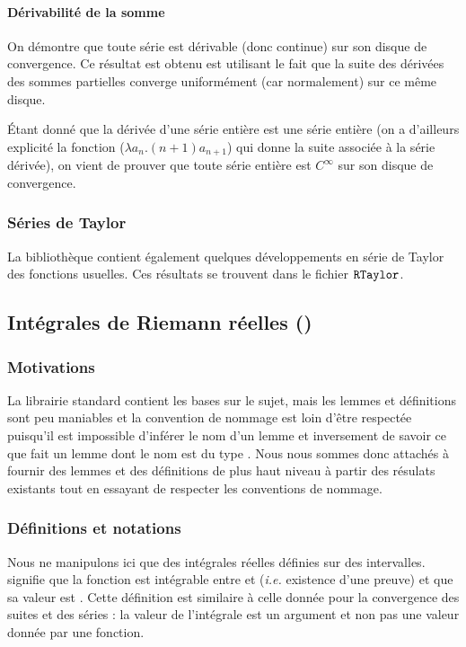 \paragraph{Dérivabilité de la somme} On démontre que toute série est dérivable (donc continue) sur son disque de convergence. Ce résultat est obtenu est utilisant le fait que la suite des dérivées des sommes partielles converge uniformément (car normalement) sur ce même disque.

Étant donné que la dérivée d'une série entière est une série entière (on a d'ailleurs explicité la fonction  ($\lambda a_n.(n+1)a_{n+1}$) qui donne la suite associée à la série dérivée), on vient de prouver que toute série entière est $C^{\infty}$ sur son disque de convergence.

\subsubsection{Séries de Taylor}

La bibliothèque contient également quelques développements en série de Taylor des fonctions usuelles. Ces résultats se trouvent dans le fichier $\texttt{RTaylor}$.

\subsection{Intégrales de Riemann réelles ()}

\subsubsection{Motivations}
	La librairie standard contient les bases sur le sujet, mais les lemmes et définitions sont peu maniables et la convention de nommage est loin d'être respectée puisqu'il est impossible d'inférer le nom d'un lemme et inversement de savoir ce que fait un lemme dont le nom est du type .
	Nous nous sommes donc attachés à fournir des lemmes et des définitions de plus haut niveau à partir des résulats existants tout en essayant de respecter les conventions de nommage.

\subsubsection{Définitions et notations}
	Nous ne manipulons ici que des intégrales réelles définies sur des intervalles.  signifie que la fonction  est intégrable entre  et  (\emph{i.e.} existence d'une preuve) et que sa valeur est . Cette définition est similaire à celle donnée pour la convergence des suites et des séries : la valeur de l'intégrale est un argument et non pas une valeur donnée par une fonction.
	

